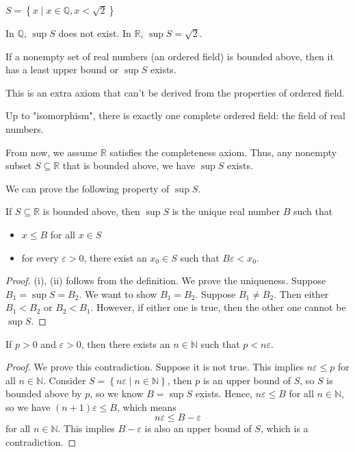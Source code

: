 \begin{eg}
  \(S = \left\{ x \mid x \in \mathbb{Q} , x < \sqrt{2}  \right\} \) 
\end{eg}

In \(\mathbb{Q} \), \(\sup S\) does not exist. In \(\mathbb{R} \), \(\sup S = \sqrt{2} \).    

\begin{theorem}
  If a nonempty set of real numbers (an ordered field) is bounded above, then it has a least upper bound or \(\sup S\) exists. 
\end{theorem}
\begin{remark}
  This is an extra axiom that can't be derived from the properties of ordered field. 
\end{remark}
\begin{remark}
  Up to "isomorphism", there is exactly one complete ordered field: the field of real numbers.
\end{remark}
\begin{remark}
  From now, we assume \(\mathbb{R} \) satisfies the completeness axiom. Thus, any nonempty subset \(S \subseteq \mathbb{R} \) that is bounded above, we have \(\sup S\) exists.   
\end{remark}
We can prove the following property of \(\sup S\).
\begin{theorem}
  If \(S \subseteq \mathbb{R} \) is bounded above, then \(\sup S\) is the unique real number \(B\) such that 
  \begin{itemize}
    \item [(i)] \(x \le B\) for all \(x \in S\)
    \item [(ii)] for every \(\varepsilon > 0\), there exist an \(x_0 \in S\) such that \(B \varepsilon < x_0\).     
  \end{itemize}   
\end{theorem} 
\begin{proof}
  (i), (ii) follows from the definition. We prove the uniqueness. Suppose \(B_1 = \sup S = B_2\). We want to show \(B_1 = B_2\). Suppose \(B_1 \neq B_2\). Then either \(B_1 < B_2\) or \(B_2 < B_1\). However, if either one is true, then the other one cannot be \(\sup S\).      
\end{proof}
\begin{theorem}\label{thm: Archimedean property}
  If \(p > 0\) and \(\varepsilon > 0\), then there exists an \(n \in \mathbb{N} \) such that \(p < n \varepsilon \).    
\end{theorem}
\begin{proof}
  We prove this contradiction. Suppose it is not true. This implies \(n \varepsilon \le p\) for all \(n \in \mathbb{N} \). Consider \(S = \left\{ n \varepsilon \mid n \in \mathbb{N}  \right\} \), then \(p\) is an upper bound of \(S\), so \(S\) is bounded above by \(p\), so we know \(B = \sup S\) exists. Hence, \(n \varepsilon \le B\) for all \(n \in \mathbb{N} \), so we have \((n+1)\varepsilon \le B\), which means
  \[
    n \varepsilon \le B - \varepsilon 
  \]   for all \(n \in \mathbb{N} \). This implies \(B - \varepsilon \) is also an upper bound of \(S\), which is a contradiction.   
\end{proof}

